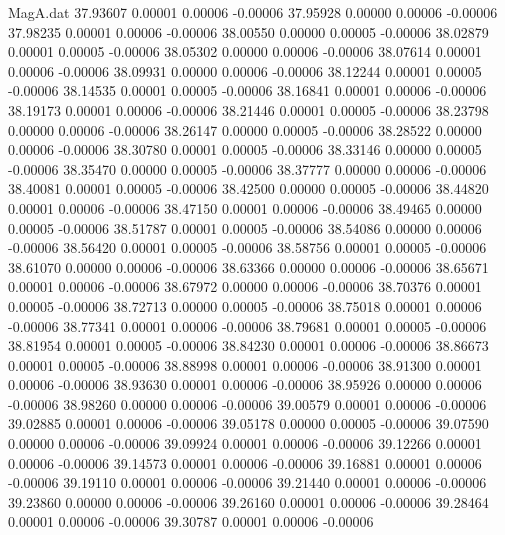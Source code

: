 \begin{filecontents}{MagA.dat}
  37.93607    0.00001    0.00006   -0.00006
  37.95928    0.00000    0.00006   -0.00006
  37.98235    0.00001    0.00006   -0.00006
  38.00550    0.00000    0.00005   -0.00006
  38.02879    0.00001    0.00005   -0.00006
  38.05302    0.00000    0.00006   -0.00006
  38.07614    0.00001    0.00006   -0.00006
  38.09931    0.00000    0.00006   -0.00006
  38.12244    0.00001    0.00005   -0.00006
  38.14535    0.00001    0.00005   -0.00006
  38.16841    0.00001    0.00006   -0.00006
  38.19173    0.00001    0.00006   -0.00006
  38.21446    0.00001    0.00005   -0.00006
  38.23798    0.00000    0.00006   -0.00006
  38.26147    0.00000    0.00005   -0.00006
  38.28522    0.00000    0.00006   -0.00006
  38.30780    0.00001    0.00005   -0.00006
  38.33146    0.00000    0.00005   -0.00006
  38.35470    0.00000    0.00005   -0.00006
  38.37777    0.00000    0.00006   -0.00006
  38.40081    0.00001    0.00005   -0.00006
  38.42500    0.00000    0.00005   -0.00006
  38.44820    0.00001    0.00006   -0.00006
  38.47150    0.00001    0.00006   -0.00006
  38.49465    0.00000    0.00005   -0.00006
  38.51787    0.00001    0.00005   -0.00006
  38.54086    0.00000    0.00006   -0.00006
  38.56420    0.00001    0.00005   -0.00006
  38.58756    0.00001    0.00005   -0.00006
  38.61070    0.00000    0.00006   -0.00006
  38.63366    0.00000    0.00006   -0.00006
  38.65671    0.00001    0.00006   -0.00006
  38.67972    0.00000    0.00006   -0.00006
  38.70376    0.00001    0.00005   -0.00006
  38.72713    0.00000    0.00005   -0.00006
  38.75018    0.00001    0.00006   -0.00006
  38.77341    0.00001    0.00006   -0.00006
  38.79681    0.00001    0.00005   -0.00006
  38.81954    0.00001    0.00005   -0.00006
  38.84230    0.00001    0.00006   -0.00006
  38.86673    0.00001    0.00005   -0.00006
  38.88998    0.00001    0.00006   -0.00006
  38.91300    0.00001    0.00006   -0.00006
  38.93630    0.00001    0.00006   -0.00006
  38.95926    0.00000    0.00006   -0.00006
  38.98260    0.00000    0.00006   -0.00006
  39.00579    0.00001    0.00006   -0.00006
  39.02885    0.00001    0.00006   -0.00006
  39.05178    0.00000    0.00005   -0.00006
  39.07590    0.00000    0.00006   -0.00006
  39.09924    0.00001    0.00006   -0.00006
  39.12266    0.00001    0.00006   -0.00006
  39.14573    0.00001    0.00006   -0.00006
  39.16881    0.00001    0.00006   -0.00006
  39.19110    0.00001    0.00006   -0.00006
  39.21440    0.00001    0.00006   -0.00006
  39.23860    0.00000    0.00006   -0.00006
  39.26160    0.00001    0.00006   -0.00006
  39.28464    0.00001    0.00006   -0.00006
  39.30787    0.00001    0.00006   -0.00006

\end{filecontents}
